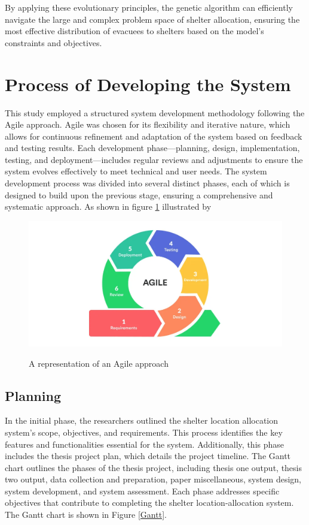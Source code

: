 	By applying these evolutionary principles, the genetic algorithm can efficiently navigate the large and complex problem space of shelter allocation, ensuring the most effective distribution of evacuees to shelters based on the model’s constraints and objectives.
	

	
	
\section{Process of Developing the System}
	This study employed a structured system development methodology following the Agile approach. Agile was chosen for its flexibility and iterative nature, which allows for continuous refinement and adaptation of the system based on feedback and testing results. Each development phase—planning, design, implementation, testing, and deployment—includes regular reviews and adjustments to ensure the system evolves effectively to meet technical and user needs.
	The system development process was divided into several distinct phases, each of which is designed to build upon the previous stage, ensuring a comprehensive and systematic approach. As shown in figure \ref{Agile} illustrated by \textcite{Jayathilaka2020}

	\begin{figure}[h!]
		\caption{A representation of an Agile approach}
		\centering
		\includegraphics[width=\textwidth]{AGILE}
		\label{Agile}
	\end{figure}

\subsection{Planning}

	In the initial phase, the researchers outlined the shelter location allocation system's scope, objectives, and requirements. This process identifies the key features and functionalities essential for the system. Additionally, this phase includes the thesis project plan, which details the project timeline.
	The Gantt chart outlines the phases of the thesis project, including thesis one output, thesis two output, data collection and preparation, paper miscellaneous, system design, system development, and system assessment. Each phase addresses specific objectives that contribute to completing the shelter location-allocation system. The Gantt chart is shown in Figure \ref{Gantt}.
	
